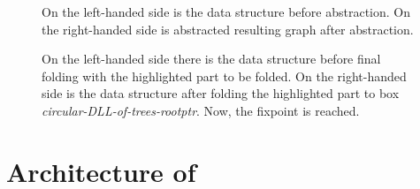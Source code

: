 {\begin{figure}
\label{ref:fig-re4}
\begin{center}
  \begin{subfigure}[b]{0.49\linewidth}
  \end{subfigure}
  \begin{subfigure}[b]{0.49\linewidth}
  \end{subfigure}
\end{center}
\caption{On the left-handed side is the data structure before abstraction.
On the right-handed side is abstracted resulting graph after abstraction.}
\end{figure}

\begin{figure}
\label{ref:fig-re5}
\begin{center}
  \begin{subfigure}[b]{0.49\linewidth}
  \end{subfigure}
  \begin{subfigure}[b]{0.49\linewidth}
  \end{subfigure}
\end{center}
\caption{On the left-handed side there is the data structure before final folding with the highlighted part to be folded.
On the right-handed side is the data structure after folding the highlighted part to box \emph{circular-DLL-of-trees-rootptr}.
Now, the fixpoint is reached.}
\end{figure}



\section{Architecture of \forester}
\label{sub:forestervata}

}
